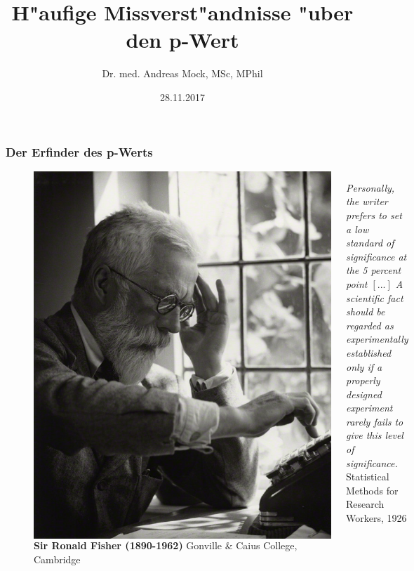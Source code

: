 \documentclass{beamer}
\title{H"aufige Missverst"andnisse "uber den p-Wert}
\author{Dr. med. Andreas Mock, MSc, MPhil} %
\institute{Nationales Centrum f"ur Tumorerkrankungen (NCT) Heidelberg}
\date{28.11.2017} %
\begin{document}
\begin{frame}
	\maketitle
\end{frame}

\begin{frame}
	\frametitle{Der Erfinder des p-Werts}
\begin{figure}
	\begin{columns}
			\centering
			\includegraphics[width=1\linewidth]{Fisher}
			\caption{\textbf{Sir Ronald Fisher (1890-1962)} Gonville \& Caius College, Cambridge}
			\label{fig:Fisher}
		\textit{\glqq Personally, the writer prefers to set a low standard of significance at the 5 percent point $[...]$ A scientific fact should be regarded as experimentally established only if a properly designed experiment rarely fails to give this level of significance.\grqq}\\
		\vspace{1em}
		 {\footnotesize Statistical Methods for Research Workers, 1926}
	\end{columns}
\end{figure}	
\end{frame}
\end{document}
